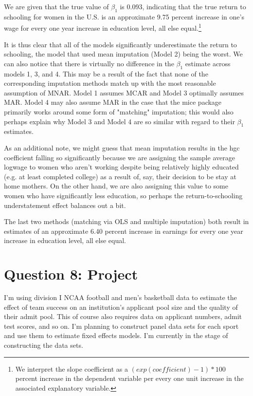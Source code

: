 \documentclass{article}
\begin{document}
\space

We are given that the true value of \(\beta_1\) is 0.093, indicating that the true return to schooling for women in the U.S. is an approximate 9.75 percent increase in one's wage for every one year increase in education level, all else equal.\footnote{We interpret the slope coefficient as a \((exp(coefficient) - 1)*100\) percent increase in the dependent variable per every one unit increase in the associated explanatory variable.}

\space

It is thus clear that all of the models significantly underestimate the return to schooling, the model that used mean imputation (Model 2) being the worst. We can also notice that there is virtually no difference in the \(\beta_1\) estimate across models 1, 3, and 4. This may be a result of the fact that none of the corresponding imputation methods match up with the most reasonable assumption of MNAR. Model 1 assumes MCAR and Model 3 optimally assumes MAR. Model 4 may also assume MAR in the case that the mice package primarily works around some form of "matching" imputation; this would also perhaps explain why Model 3 and Model 4 are so similar with regard to their \(\beta_1\) estimates.

\space

As an additional note, we might guess that mean imputation results in the hgc coefficient falling so significantly because we are assigning the sample average logwage to women who aren't working despite being relatively highly educated (e.g. at least completed college) as a result of, say, their decision to be stay at home mothers. On the other hand, we are also assigning this value to some women who have significantly less education, so perhaps the return-to-schooling understatement effect balances out a bit.

\space

The last two methods (matching via OLS and multiple imputation) both result in estimates of an approximate 6.40 percent increase in earnings for every one year increase in education level, all else equal.


\section{Question 8: Project}

I'm using division I NCAA football and men's basketball data to estimate the effect of team success on an institution's applicant pool size and the quality of their admit pool. This of course also requires data on applicant numbers, admit test scores, and so on. I'm planning to construct panel data sets for each sport and use them to estimate fixed effects models. I'm currently in the stage of constructing the data sets.
\end{document}
